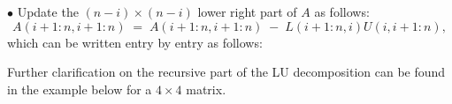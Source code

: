 

\begin{center}
\end{center}

\noindent $\bullet$ Update the $(n-i)\times(n-i)$ lower right part of $A$ as follows:
\begin{equation}
A(i+1:n,i+1:n) \;=\; A(i+1:n,i+1:n) \;-\; L(i+1:n,i)U(i,i+1:n),
\end{equation}
which can be written entry by entry as follows:

\begin{center}
\end{center}

Further clarification on the recursive part of the LU decomposition can be
found in the example below for a $4\times 4$ matrix.


